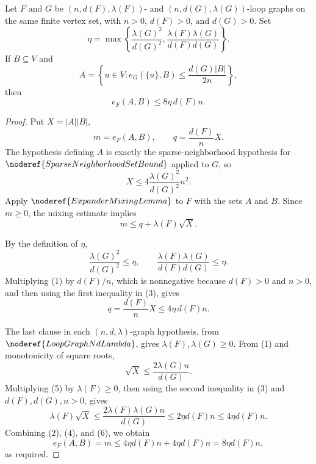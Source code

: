 \begin{helper}
Let \(F\) and \(G\) be \((n,d(F),\lambda(F))\)- and
\((n,d(G),\lambda(G))\)-loop graphs on the same finite vertex set, with
\(n>0\), \(d(F)>0\), and \(d(G)>0\).  Set
\[
  \eta=\max\left\{\frac{\lambda(G)^2}{d(G)^2},
  \frac{\lambda(F)\lambda(G)}{d(F)d(G)}\right\}.
\]
If \(B\subseteq V\) and
\[
  A=\left\{u\in V:
    e_G(\{u\},B)\le \frac{d(G)|B|}{2n}\right\},
\]
then
\[
  e_F(A,B)\le 8\eta\,d(F)n .
\]
\end{helper}
\begin{proof}
Put \(X=|A||B|\),
\[
  m=e_F(A,B),\qquad q=\frac{d(F)}{n}X .
\]
The hypothesis defining \(A\) is exactly the sparse-neighborhood hypothesis
for \(\noderef{SparseNeighborhoodSetBound}\) applied to \(G\), so
\[
  X\le 4\frac{\lambda(G)^2}{d(G)^2}n^2. \tag{1}
\]
Apply \(\noderef{ExpanderMixingLemma}\) to \(F\) with the sets \(A\) and \(B\).
Since \(m\ge 0\), the mixing estimate implies
\[
  m\le q+\lambda(F)\sqrt X. \tag{2}
\]

By the definition of \(\eta\),
\[
  \frac{\lambda(G)^2}{d(G)^2}\le \eta,\qquad
  \frac{\lambda(F)\lambda(G)}{d(F)d(G)}\le \eta. \tag{3}
\]
Multiplying (1) by \(d(F)/n\), which is nonnegative because \(d(F)>0\) and
\(n>0\), and then using the first inequality in (3), gives
\[
  q=\frac{d(F)}n X
  \le 4\eta\,d(F)n. \tag{4}
\]

The last clause in each \((n,d,\lambda)\)-graph hypothesis, from
\(\noderef{LoopGraphNdLambda}\), gives \(\lambda(F),\lambda(G)\ge0\).  From
(1) and monotonicity of square roots,
\[
  \sqrt X\le \frac{2\lambda(G)n}{d(G)}. \tag{5}
\]
Multiplying (5) by \(\lambda(F)\ge0\), then using the second inequality in
(3) and \(d(F),d(G),n>0\), gives
\[
  \lambda(F)\sqrt X
  \le \frac{2\lambda(F)\lambda(G)n}{d(G)}
  \le 2\eta d(F)n
  \le 4\eta d(F)n. \tag{6}
\]
Combining (2), (4), and (6), we obtain
\[
  e_F(A,B)=m
  \le 4\eta d(F)n+4\eta d(F)n
  =8\eta d(F)n,
\]
as required.
\end{proof}
